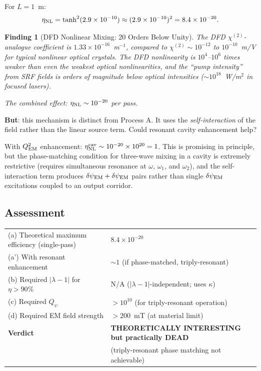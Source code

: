 \documentclass[11pt]{article}
\newtheorem{finding}{Finding}
\newcommand{\ee}[1]{\times 10^{#1}}
\newcommand{\dpsiEM}{\delta\psi_{\rm EM}}
\newcommand{\lambdaone}{|\lambda{-}1|}
\newcommand{\Qpsi}{Q_\psi}
\newcommand{\QEM}{Q_{\rm EM}}
\begin{document}
For $L = 1$~m:
\begin{equation}
\eta_{\rm NL} = \tanh^2(2.9\ee{-10}) \approx (2.9\ee{-10})^2
= 8.4\ee{-20}.
\end{equation}

\begin{finding}[DFD Nonlinear Mixing: 20 Orders Below Unity]
\label{find:nonlinear-weak}
The DFD $\chi^{(2)}$-analogue coefficient is $1.33\ee{-16}$~m$^{-1}$,
compared to $\chi^{(2)} \sim 10^{-12}$ to $10^{-10}$~m/V for typical
nonlinear optical crystals. The DFD nonlinearity is $10^4$--$10^6$
times weaker than even the weakest optical nonlinearities, and the
``pump intensity'' from SRF fields is orders of magnitude below
optical intensities ($\sim 10^{18}$~W/m$^2$ in focused lasers).

The combined effect: $\eta_{\rm NL} \sim 10^{-20}$ per pass.
\end{finding}

\textbf{But}: this mechanism is distinct from Process A. It uses the
\emph{self-interaction} of the field rather than the linear source term.
Could resonant cavity enhancement help?

With $\QEM^2$ enhancement: $\eta_{\rm NL}^{\rm cav} \sim 10^{-20}
\times 10^{20} = 1$. This is promising in principle, but the phase-matching
condition for three-wave mixing in a cavity is extremely restrictive
(requires simultaneous resonance at $\omega$, $\omega_1$, and $\omega_2$),
and the self-interaction term produces $\dpsiEM + \dpsiEM$ pairs rather
than single $\dpsiEM$ excitations coupled to an output corridor.

\subsection{Assessment}

\begin{center}
\begin{tabular}{ll}
\toprule
(a) Theoretical maximum efficiency (single-pass) & $8.4\ee{-20}$ \\
(a') With resonant enhancement & $\sim 1$ (if phase-matched, triply-resonant) \\
(b) Required $\lambdaone$ for $\eta > 90\%$ & N/A ($\lambdaone$-independent; uses $\kappa$) \\
(c) Required $\Qpsi$ & $>10^{10}$ (for triply-resonant operation) \\
(d) Required EM field strength & $>200$~mT (at material limit) \\
\midrule
\textbf{Verdict} & \textbf{THEORETICALLY INTERESTING but practically DEAD} \\
& (triply-resonant phase matching not achievable) \\
\bottomrule
\end{tabular}
\end{center}
\end{document}
